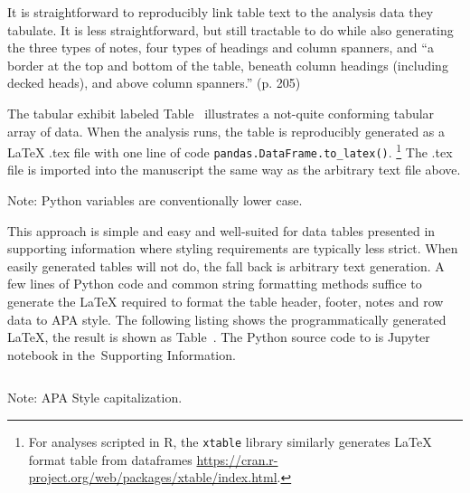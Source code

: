 \documentclass[helv,10pt,man,floatsintext]{apa6}  %
\begin{document}
\noindent
It is straightforward to reproducibly link table text to the analysis
data they tabulate. It is less straightforward, but still tractable to
do while also generating the three types of notes, four types of
headings and column spanners, and ``a border at the top and bottom of
the table, beneath column headings (including decked heads), and above
column spanners.''  (p. 205)

The tabular exhibit labeled Table~ illustrates a
not-quite conforming tabular array of data. When the analysis runs,
the table is reproducibly generated as a \LaTeX{} .tex file with one
line of code \texttt{pandas.DataFrame.to_latex()}. 
\footnote{
  For analyses scripted in R, the \texttt{xtable} library
  similarly generates \LaTeX{} format table from dataframes
  \url{https://cran.r-project.org/web/packages/xtable/index.html}.
}
The .tex file is imported into the manuscript the same way as the arbitrary
text file above.

\begin{table}[ht]
  \centering
  \caption{A non-APA Style data table and note generated
    as \LaTeX{} by calling \texttt{pandas.DataFrame.to_latex()}.} 
  \begin{threeparttable}
    
    \begin{tablenotes}[flushleft]
      Note: Python variables are conventionally lower case.
    \end{tablenotes}
  \end{threeparttable}
\end{table}

\noindent
This approach is simple and easy and well-suited for data tables
presented in supporting information where styling requirements are
typically less strict. When easily generated tables will not do, the
fall back is arbitrary text generation.  A few lines of Python code
and common string formatting methods suffice to generate the \LaTeX{}
required to format the table header, footer, notes and row data to APA
style. The following listing shows the programmatically generated
\LaTeX{}, the result is shown as Table~. The Python
source code to is Jupyter notebook in the~Supporting
Information.

\inputminted{latex}{generated/p3_table2.tex}


\begin{table}[ht]
  \centering
  \caption{An APA style data table and note generated as \LaTeX{} with
    a few lines of pure Python.}

  \centering
  \begin{threeparttable}
    
    \begin{tablenotes}
      Note: APA Style capitalization.
    \end{tablenotes}
  \end{threeparttable}
\end{table}
\end{document}
